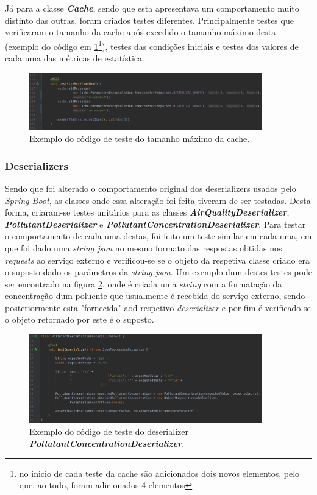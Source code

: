 Já para a classe \textbf{\textit{Cache}}, sendo que esta apresentava um comportamento muito distinto das outras, foram criados testes diferentes. Principalmente testes que verificaram o tamanho da cache após excedido o tamanho máximo desta (exemplo do código em \ref{fig:cache_max}\footnote{no inicio de cada teste da cache são adicionados dois novos elementos, pelo que, ao todo, foram adicionados 4 elementos}), testes das condições iniciais e testes dos valores de cada uma das métricas de estatística.

\begin{figure}[h]
   \centering
   \includegraphics[width=0.90\textwidth]{images/cache_max}
   \caption{Exemplo do código de teste do tamanho máximo da cache.}
   \label{fig:cache_max}
\end{figure}


\subsubsection{Deserializers}
Sendo que foi alterado o comportamento original dos deserializers usados pelo \textit{Spring Boot}, as classes onde essa alteração foi feita tiveram de ser testadas. Desta forma, criaram-se testes unitários para as classes \textbf{\textit{AirQualityDeserializer}}, \textbf{\textit{PollutantDeserializer}} e \textbf{\textit{PollutantConcentrationDeserializer}}. 
Para testar o comportamento de cada uma destas, foi feito um teste similar em cada uma, em que foi dado uma \textit{string json} no mesmo formato das respostas obtidas nos \textit{requests} ao serviço externo e verificou-se se o objeto da respetiva classe criado era o suposto dado os parâmetros da \textit{string json}. 
Um exemplo dum destes testes pode ser encontrado na figura \ref{fig:serializer_test}, onde é criada uma \textit{string} com a formatação da concentração dum poluente que usualmente é recebida do serviço externo, sendo posteriormente esta "fornecida" aod respetivo \textit{deserializer} e por fim é verificado se o objeto retornado por este é o suposto.

\begin{figure}[h]
   \centering
   \includegraphics[width=0.90\textwidth]{images/serializer_test}
   \caption{Exemplo do código de teste do deserializer \textbf{\textit{PollutantConcentrationDeserializer}}.}
   \label{fig:serializer_test}
\end{figure}


